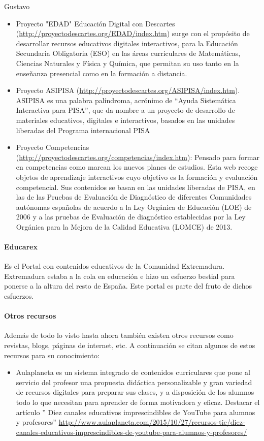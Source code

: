 \begin{opin}{\guscolor}{Gustavo}
\begin{itemize}
\item Proyecto "EDAD" Educación Digital con Descartes (\url{http://proyectodescartes.org/EDAD/index.htm}) surge con el propósito de desarrollar recursos educativos digitales interactivos, para la Educación Secundaria Obligatoria (ESO) en las áreas curriculares de Matemáticas, Ciencias Naturales y Física y Química, que permitan su uso tanto en la enseñanza presencial como en la formación a distancia. 

 

\item Proyecto ASIPISA (\url{http://proyectodescartes.org/ASIPISA/index.htm}). ASIPISA es una palabra palíndroma, acrónimo de “Ayuda Sistemática Interactiva para PISA”, que da nombre a un proyecto de desarrollo de materiales educativos, digitales e interactivos, basados en las unidades liberadas del Programa internacional PISA 

 

\item Proyecto Competencias (\url{http://proyectodescartes.org/competencias/index.htm}): Pensado para formar en competencias como marcan los nuevos planes de estudios. Esta web recoge objetos de aprendizaje interactivos cuyo objetivo es la formación y evaluación competencial. Sus contenidos se basan en las unidades liberadas de PISA, en las de las Pruebas de Evaluación de Diagnóstico de diferentes Comunidades autónomas españolas de acuerdo a la Ley Orgánica de Educación (LOE) de 2006 y a las pruebas de Evaluación de diagnóstico establecidas por la Ley Orgánica para la Mejora de la Calidad Educativa (LOMCE) de 2013. 
\end{itemize}

\paragraph{Educarex}
Es el Portal con contenidos educativos de la Comunidad Extremadura. Extremadura estaba a la cola en educación e hizo un esfuerzo bestial para ponerse a la altura del resto de España. Este portal es parte del fruto de dichos esfuerzos.

\paragraph{Otros recursos}
Además de todo lo visto hasta ahora también existen otros recursos como revistas, blogs, páginas de internet, etc. A continuación se citan algunos de estos recursos para su conocimiento:
\begin{itemize}
\item Aulaplaneta es un sistema integrado de contenidos curriculares que pone al servicio del profesor una propuesta didáctica personalizable y gran variedad de recursos digitales para preparar sus clases, y a disposición de los alumnos todo lo que necesitan para aprender de forma motivadora y eficaz. Destacar el artículo ” Diez canales educativos imprescindibles de YouTube para alumnos y profesores” \url{http://www.aulaplaneta.com/2015/10/27/recursos-tic/diez-canales-educativos-imprescindibles-de-youtube-para-alumnos-y-profesores/}  


\end{itemize}
\end{opin}
